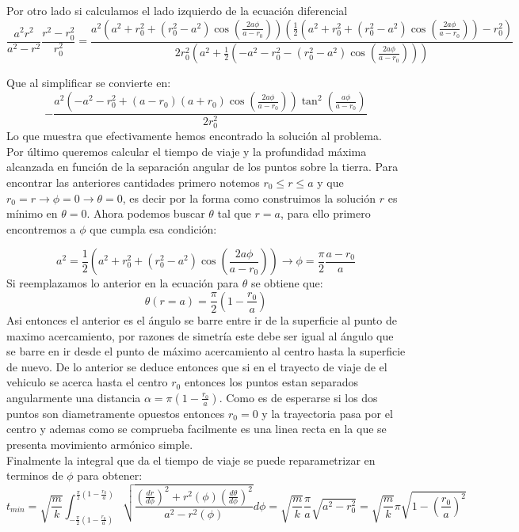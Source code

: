 \documentclass[letterpaper,10pt]{article}
\begin{document}
Por otro lado si calculamos el lado izquierdo de la ecuaci\'on diferencial 
$$\frac{a^2 r^2}{a^2-r^2}\frac{r^2-r_0^2}{r_0^2}=\frac{a^2 \left(a^2+r_0^2+\left(r_0^2-a^2\right) \cos \left(\frac{2 a \phi
   }{a-r_0}\right)\right) \left(\frac{1}{2}
   \left(a^2+r_0^2+\left(r_0^2-a^2\right) \cos \left(\frac{2 a \phi
   }{a-r_0}\right)\right)-r_0^2\right)}{2 r_0^2 \left(a^2+\frac{1}{2}
   \left(-a^2-r_0^2-\left(r_0^2-a^2\right) \cos \left(\frac{2 a \phi
   }{a-r_0}\right)\right)\right)}$$ 


Que al simplificar se convierte en:
$$-\frac{a^2 \left(-a^2-r_{0}^2+(a-r_{0})
   (a+r_{0}) \cos \left(\frac{2 a \phi
   }{a-r_{0}}\right)\right) \tan ^2\left(\frac{a
   \phi }{a-r_{0}}\right)}{2 r_{0}^2}$$
Lo que muestra que efectivamente hemos encontrado la soluci\'on al problema.
\\
Por \'ultimo queremos calcular el tiempo de viaje y la profundidad m\'axima alcanzada en funci\'on de la separaci\'on angular de los puntos sobre la tierra.
Para encontrar las anteriores cantidades primero notemos $r_0\leq r\leq a$ y que $r_0=r \rightarrow \phi=0 \rightarrow \theta=0$, es decir por la forma como construimos la soluci\'on $r$ es m\'inimo en $\theta=0$. Ahora podemos buscar $\theta$ tal que $r=a$, para ello primero encontremos  a $\phi$ que cumpla esa condici\'on:

$$a^2=\frac{1}{2}
   \left(a^2+r_{0}^2+\left(r_{0}^2-a^2\right)
   \cos \left(\frac{2 a \phi
   }{a-r_{0}}\right)\right) \rightarrow \phi=\frac{\pi}{2} \frac{a-r_0}{a}
$$
Si reemplazamos lo anterior en la ecuaci\'on para $\theta$ se obtiene que:
$$\theta(r=a)=\frac{\pi}{2}\left(1-\frac{r_0}{a}\right)$$
Asi entonces el anterior es el \'angulo se barre entre ir de la superficie al punto de maximo acercamiento, por razones de simetr\'ia este debe ser igual al \'angulo que se barre en ir desde el punto de m\'aximo acercamiento al centro hasta la superficie de nuevo. De lo anterior se deduce entonces que si en el trayecto de viaje de el vehiculo se acerca hasta el centro $r_0$ entonces los puntos estan separados angularmente una distancia $\alpha=\pi \left(1-\frac{r_0}{a}\right)$. Como es de esperarse si los dos puntos son diametramente opuestos entonces $r_0=0$ y la trayectoria pasa por el centro y ademas como se comprueba facilmente es una linea recta en la que se presenta movimiento arm\'onico simple.\\
Finalmente la integral que da el tiempo de viaje se puede reparametrizar en terminos de $\phi$ para obtener:
$$
t_{min}=\sqrt{\frac{m}{k}}\int_{-\frac{\pi}{2}(1-\frac{r_0}{a})}^{\frac{\pi}{2}(1-\frac{r_0}{a})} 
\sqrt{\frac{\left(\frac{dr}{d\phi} \right)^2+r^2(\phi)\left(\frac{d\theta}{d\phi} \right)^2}{a^2-r^2(\phi)}} d\phi=\sqrt{\frac{m}{k}} \frac{\pi}{a}\sqrt{a^2-r_0^2}=\sqrt{\frac{m}{k}} \pi\sqrt{1-\left(\frac{r_0}{a}\right)^2}
$$
\end{document}

